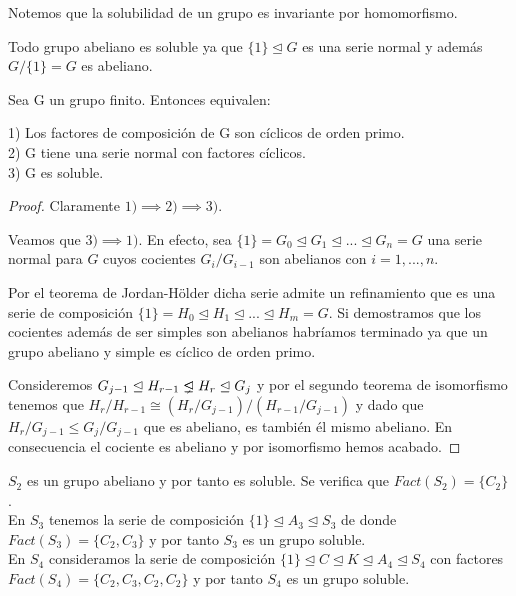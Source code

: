 Notemos que la solubilidad de un grupo es invariante por homomorfismo.

\begin{example}
Todo grupo abeliano es soluble ya que $\{1\} \trianglelefteq G$ es una serie normal y además $G/\{1\} = G$ es abeliano.
\end{example}

\begin{theorem}
Sea G un grupo finito. Entonces equivalen:

1) Los factores de composición de G son cíclicos de orden primo.\\
2) G tiene una serie normal con factores cíclicos.\\
3) G es soluble.
\end{theorem}
\begin{proof}
Claramente $1) \implies 2) \implies 3)$.

Veamos que $3) \implies 1)$. En efecto, sea $\{1\} = G_0 \trianglelefteq G_1 \trianglelefteq ... \trianglelefteq G_n = G$ una serie normal para $G$ cuyos cocientes $G_i/G_{i-1}$ son abelianos con $i = 1, ... ,n$.

Por el teorema de Jordan-Hölder dicha serie admite un refinamiento que es una serie de composición $\{1\} = H_0 \trianglelefteq H_1 \trianglelefteq ... \trianglelefteq H_m = G$. Si demostramos que los cocientes además de ser simples son abelianos habríamos terminado ya que un grupo abeliano y simple es cíclico de orden primo. 

Consideremos $G_{j-1} \trianglelefteq H_{r-1} \propernormal H_{r} \trianglelefteq G_{j}$ y por el segundo teorema de isomorfismo tenemos que $H_r/H_{r-1} \cong (H_r/G_{j-1})/(H_{r-1}/G_{j-1})$ y dado que $H_r/G_{j-1} \le G_j/G_{j-1}$ que es abeliano, es también él mismo abeliano. En consecuencia el cociente es abeliano y por isomorfismo hemos acabado.
\end{proof}

\begin{example}
$S_2$ es un grupo abeliano y por tanto es soluble. Se verifica que $Fact(S_2) = \{C_2\}$.\\
En $S_3$ tenemos la serie de composición $\{1\} \trianglelefteq A_3 \trianglelefteq S_3$ de donde $Fact(S_3) = \{C_2,C_3\}$ y por tanto $S_3$ es un grupo soluble.\\
En $S_4$ consideramos la serie de composición $\{1\} \trianglelefteq C \trianglelefteq K \trianglelefteq A_4 \trianglelefteq S_4$ con factores $Fact(S_4) = \{C_2,C_3,C_2,C_2\}$ y por tanto $S_4$ es un grupo soluble.
\end{example}

